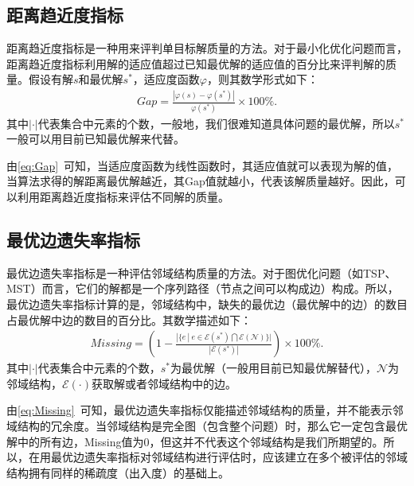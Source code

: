 \subsection{距离趋近度指标}
\label{subsec:背景介绍:性能评价指标:距离趋近度指标}
距离趋近度指标是一种用来评判单目标解质量的方法。对于最小化优化问题而言，距离趋近度指标利用解的适应值超过已知最优解的适应值的百分比来评判解的质量。假设有解$s$和最优解$s^*$，适应度函数$\varphi$，则其数学形式如下：
\begin{align}
    \label{eq:Gap}
    Gap = \frac{|\varphi (s) - \varphi (s^*)|}{\varphi (s^*)} \times 100\%.
\end{align}
其中$| \cdot  \vert $代表集合中元素的个数，一般地，我们很难知道具体问题的最优解，所以$s^*$一般可以用目前已知最优解来代替。
\par
由\autoref{eq:Gap}~可知，当适应度函数为线性函数时，其适应值就可以表现为解的值，当算法求得的解距离最优解越近，其Gap值就越小，代表该解质量越好。因此，可以利用距离趋近度指标来评估不同解的质量。

\subsection{最优边遗失率指标}
\label{subsec:背景介绍:性能评价指标:最优边遗失率指标}
最优边遗失率指标是一种评估邻域结构质量的方法。对于图优化问题（如TSP、MST）而言，它们的解都是一个序列路径（节点之间可以构成边）构成。所以，最优边遗失率指标计算的是，邻域结构中，缺失的最优边（最优解中的边）的数目占最优解中边的数目的百分比。其数学描述如下：
\begin{align}
    \label{eq:Missing}
    Missing = (1 - \frac{|\{ e \ | \ e \in  \mathcal{E} (s^*) \bigcap \mathcal{E} (\mathcal{N}) \} |}{|\mathcal{E} (s^*)|}) \times 100\%.
\end{align}
其中$| \cdot  \vert $代表集合中元素的个数，$s^*$为最优解（一般用目前已知最优解替代），$\mathcal{N}$为邻域结构，$\mathcal{E} (\cdot)$获取解或者邻域结构中的边。
\par
由\autoref{eq:Missing}~可知，最优边遗失率指标仅能描述邻域结构的质量，并不能表示邻域结构的冗余度。当邻域结构是完全图（包含整个问题）时，那么它一定包含最优解中的所有边，Missing值为0，但这并不代表这个邻域结构是我们所期望的。所以，在用最优边遗失率指标对邻域结构进行评估时，应该建立在多个被评估的邻域结构拥有同样的稀疏度（出入度）的基础上。

